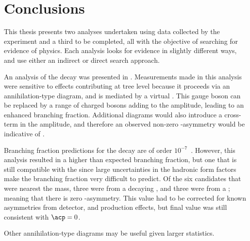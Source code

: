 \chapter{Conclusions}
\label{ch:conc}


This thesis presents two analyses undertaken using data collected by the \lhcb experiment
and a third to be completed, all
with the objective of searching for evidence of \bsm physics.
Each analysis looks for evidence in slightly different ways, and use either an indirect or direct
search approach.

An analysis of the decay \btodsphi was presented in .
Measurements made in this analysis were sensitive to \np effects contributing at tree
level because it proceeds via an annihilation-type diagram, and is mediated by a virtual \Wp.
This gauge boson can be replaced by a range of charged bosons adding to the amplitude, leading to
an enhanced branching fraction.
Additional \np diagrams would also introduce a cross-term in the amplitude, and therefore an
observed non-zero \CP-asymmetry would be indicative of \np.

Branching fraction predictions for the decay \btodsphi are of order
$10^{-7}$~\cite{Zou:2009zza,Mohanta:2002wf,PhysRevD.76.057701,Lu:2001yz}.
However, this analysis resulted in a higher than expected branching fraction, but one that is
still compatible with the \sm since large uncertainties in the hadronic form factors make the
branching fraction very difficult to predict.
Of the six candidates that were nearest the \Bp mass, three were from a decaying \Bp, and three
were from a \Bm; meaning that there is zero \CP-asymmetry.
This value had to be corrected for known asymmetries from detector, and production effects, but
final value was still consistent with $\acp=0$.

Other annihilation-type diagrams may be useful given larger statistics.


